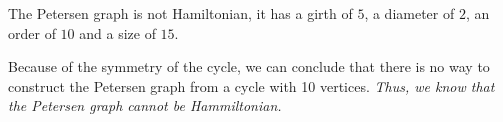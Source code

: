 \documentclass[a4paper]{article}
\begin{document}
\begin{solution}{9}
\begin{theorem}{The Petersen graph is not Hamiltonian, it has a girth of $5$, a diameter of $2$, an order of $10$ and a size of $15$.}
\begin{itemize}
\begin{center}
					\end{center}
			\end{itemize}
			Because of the symmetry of the cycle, we can conclude that there is no way to construct the Petersen graph from a cycle with 10 vertices.
			\emph{Thus, we know that the Petersen graph cannot be Hammiltonian.}
		\end{theorem}
	\end{solution}
	\newpage
\end{document}
